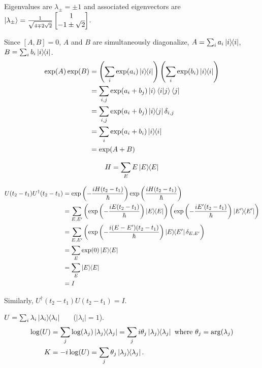 Eigenvalues are $\lambda_\pm = \pm 1$ and associated eigenvectors are $\ket{\lambda_\pm} = \frac{1}{\sqrt{4 \mp 2 \sqrt{2}}} \begin{bmatrix}
1 \\
-1 \pm \sqrt{2}
\end{bmatrix} $.





Since $[A, B] = 0$, $A$ and $B$ are simultaneously diagonalize, $A = \sum_i a_i \ket{i}\hspace{-1mm} \bra{i}$, $B = \sum_i b_i \ket{i}\hspace{-1mm} \bra{i}$.
\begin{align*}
	\exp (A) \exp (B) &= \left(\sum_i \exp (a_i) \ket{i}\hspace{-1mm} \bra{i}\right) \left(\sum_i \exp (b_i) \ket{i}\hspace{-1mm} \bra{i}\right) \\
		&= \sum_{i,j} \exp (a_i + b_j) \ket{i} \braket{i | j} \bra{j}\\
		&= \sum_{i,j} \exp (a_i + b_j) \ket{i}\hspace{-1mm} \bra{j} \delta_{i, j}\\
		&= \sum_i \exp (a_i +  b_i) \ket{i}\hspace{-1mm} \bra{i}\\
		&= \exp (A+B)
\end{align*}


\begin{align*}
	H = \sum_E E \ket{E}\hspace{-1mm} \bra{E}
\end{align*}

\begin{align*}
	U(t_2 - t_1) U^\dagger (t_2 - t_1) &= \exp \left( - \frac{iH(t_2 - t_1)}{\hbar} \right)  \exp \left(  \frac{iH(t_2 - t_1)}{\hbar} \right)\\
		&= \sum_{E, E'} \left(\exp \left(- \frac{iE(t_2 - t_1)}{\hbar} \right) \ket{E}\hspace{-1mm} \bra{E} \right)
										\left(\exp \left(- \frac{iE'(t_2 - t_1)}{\hbar} \right) \ket{E'}\hspace{-1mm} \bra{E'} \right)\\
		&= \sum_{E, E'} \left(\exp \left(- \frac{i(E-E')(t_2 - t_1)}{\hbar} \right) \ket{E}\hspace{-1mm} \bra{E'} \delta_{E,E'} \right) \\
		&= \sum_E \exp(0) \ket{E}\hspace{-1mm} \bra{E}\\
		&= \sum_E \ket{E}\hspace{-1mm} \bra{E}\\
		&= I
\end{align*}

Similarly, $U^\dagger (t_2 - t_1) U (t_2 - t_1) = I$.




$U = \sum_i \lambda_i \ket{\lambda_i}\hspace{-1mm} \bra{\lambda_i}$~~~ ($|\lambda_i| = 1$).
\begin{align*}
	\log (U) &= \sum_j \log (\lambda_j) \ket{\lambda_j}\hspace{-1mm} \bra{\lambda_j} = \sum_j i \theta_j  \ket{\lambda_j}\hspace{-1mm} \bra{\lambda_j} \text{ where } \theta_j = \arg (\lambda_j)\\
	K &= - i \log(U) = \sum_j \theta_j \ket{\lambda_j}\hspace{-1mm} \bra{\lambda_j}.
\end{align*}

